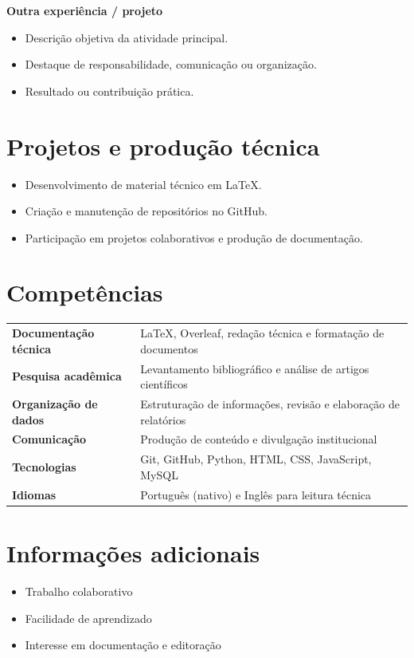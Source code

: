\documentclass[10pt,a4paper]{article}
\begin{document}
\textbf{Outra experiência / projeto}
\begin{itemize}
    \item Descrição objetiva da atividade principal.
    \item Destaque de responsabilidade, comunicação ou organização.
    \item Resultado ou contribuição prática.
\end{itemize}

\section*{Projetos e produção técnica}
\begin{itemize}
    \item Desenvolvimento de material técnico em \LaTeX{}.
    \item Criação e manutenção de repositórios no GitHub.
    \item Participação em projetos colaborativos e produção de documentação.
\end{itemize}

\section*{Competências}
\begin{tabularx}{\textwidth}{>{\bfseries}p{3.7cm} X}
Documentação técnica & \LaTeX{}, Overleaf, redação técnica e formatação de documentos \\
Pesquisa acadêmica & Levantamento bibliográfico e análise de artigos científicos \\
Organização de dados & Estruturação de informações, revisão e elaboração de relatórios \\
Comunicação & Produção de conteúdo e divulgação institucional \\
Tecnologias & Git, GitHub, Python, HTML, CSS, JavaScript, MySQL \\
Idiomas & Português (nativo) e Inglês para leitura técnica \\
\end{tabularx}

\section*{Informações adicionais}
\begin{itemize}
    \item Trabalho colaborativo
    \item Facilidade de aprendizado
    \item Interesse em documentação e editoração
\end{itemize}
\end{document}
